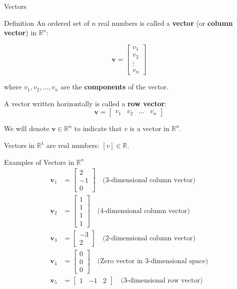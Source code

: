 \documentclass{beamer}
\begin{document}
\begin{frame}{Vectors}
  \begin{block}{Definition}
  An ordered set of \( n \) real numbers is called a \textbf{vector} (or \textbf{column vector}) in \( \mathbb{R}^n \):
  
  \[
  \mathbf{v} = \begin{bmatrix} v_1 \\ v_2 \\ \vdots \\ v_n \end{bmatrix}
  \]

  where \( v_1, v_2, \ldots, v_n \) are the \textbf{components} of the vector.

  A vector written horizontally is called a \textbf{row vector}:
  \[\mathbf{v} = \begin{bmatrix} v_1 & v_2 & \ldots & v_n \end{bmatrix}\]
\end{block}

We will denote $\mathbf{v} \in \mathbb{R}^n$ to indicate that $v$ is a vector in \( \mathbb{R}^n \).

\pause Vectors in $\mathbb{R}^1$ \pause are real numbers: $[v]\in\mathbb{R}$.
  \end{frame}

\begin{frame}{Examples of Vectors in \( \mathbb{R}^n \)}
  \begin{align*}
    \mathbf{v}_1 &= \begin{bmatrix} 2 \\ -1 \\ 0 \end{bmatrix} \quad \text{(3-dimensional column vector)} \\
    \mathbf{v}_2 &= \begin{bmatrix} 1 \\ 1 \\ 1 \\ 1 \end{bmatrix} \quad \text{(4-dimensional column vector)} \\
    \mathbf{v}_3 &= \begin{bmatrix} -3 \\ 2 \end{bmatrix} \quad \text{(2-dimensional column vector)} \\
    \mathbf{v}_4 &= \begin{bmatrix} 0 \\ 0 \\ 0 \end{bmatrix} \quad \text{(Zero vector in 3-dimensional space)} \\
    \mathbf{v}_5 &= \begin{bmatrix} 1 & -1 & 2 \end{bmatrix} \quad \text{(3-dimensional row vector)}
  \end{align*}
\end{frame}
\end{document}
